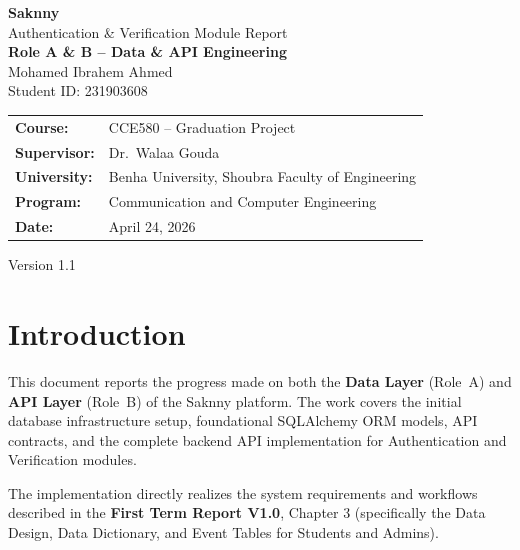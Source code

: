 \documentclass[12pt,a4paper]{article}
\begin{document}
\begin{titlepage}
    \centering
    \vspace*{3cm}

    {\Huge\bfseries\textcolor{saknnyprimary}{Saknny}}\\[0.5cm]
    {\Large\textcolor{saknnyaccent}{Authentication \& Verification Module Report}}\\[1.5cm]

    {\large\textbf{Role A \& B -- Data \& API Engineering}}\\[0.5cm]
    {\large Mohamed Ibrahem Ahmed}\\[0.3cm]
    {\large Student ID: 231903608}\\[2cm]

    \begin{tabular}{ll}
        \textbf{Course:}     & CCE580 -- Graduation Project \\
        \textbf{Supervisor:} & Dr.\ Walaa Gouda \\
        \textbf{University:} & Benha University, Shoubra Faculty of Engineering \\
        \textbf{Program:}    & Communication and Computer Engineering \\
        \textbf{Date:}       & April 24, 2026 \\
    \end{tabular}

    \vfill
    {\small Version 1.1}
\end{titlepage}

\tableofcontents
\newpage

\section{Introduction}

This document reports the progress made on both the \textbf{Data Layer} (Role~A) and \textbf{API Layer} (Role~B) of the Saknny platform. The work covers the initial database infrastructure setup, foundational SQLAlchemy ORM models, API contracts, and the complete backend API implementation for Authentication and Verification modules.

The implementation directly realizes the system requirements and workflows described in the \textbf{First Term Report V1.0}, Chapter 3 (specifically the Data Design, Data Dictionary, and Event Tables for Students and Admins).
\end{document}
